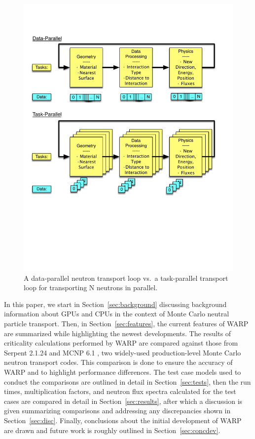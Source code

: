 \documentclass[preprint,12pt]{elsarticle}
\begin{document}
\begin{figure}[!htbp] 
  \centering
    \includegraphics[width=\textwidth]{graphics/datavtask.pdf}
     \caption{A data-parallel neutron transport loop vs.\ a task-parallel transport loop for transporting N neutrons in parallel.  \label{datavtask} }
\end{figure}

In this paper, we start in Section~\ref{sec:background} discussing background information about GPUs and CPUs in the context of Monte Carlo neutral particle transport. Then, in Section~\ref{sec:features}, the current features of WARP are summarized while highlighting the newest developments.  The results of criticality calculations performed by WARP are compared against those from Serpent 2.1.24 \cite{jaakko,serpent} and MCNP 6.1 \cite{mcnp6}, two widely-used production-level Monte Carlo neutron transport codes.  This comparison is done to ensure the accuracy of WARP and to highlight performance differences.  The test case models used to conduct the comparisons are outlined in detail in Section~\ref{sec:tests}, then the run times, multiplication factors, and neutron flux spectra calculated for the test cases are compared in detail in Section~\ref{sec:results}, after which a discussion is given summarizing comparisons and addressing any discrepancies shown in Section~\ref{sec:disc}.  Finally, conclusions about the initial development of WARP are drawn and future work is roughly outlined in Section~\ref{sec:concdev}. 
\end{document}
